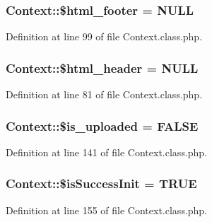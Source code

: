 \hypertarget{classContext_ad55e79b648659c59512e02a6c0d349ff}{
\subsubsection[{\$html\-\_\-footer}]{\setlength{\rightskip}{0pt plus 5cm}Context\-::\$html\-\_\-footer = N\-U\-L\-L}}\label{classContext_ad55e79b648659c59512e02a6c0d349ff}


Definition at line 99 of file Context.\-class.\-php.

\hypertarget{classContext_ab0146079ffcc658bbe5bbf4ba7b8e934}{
\subsubsection[{\$html\-\_\-header}]{\setlength{\rightskip}{0pt plus 5cm}Context\-::\$html\-\_\-header = N\-U\-L\-L}}\label{classContext_ab0146079ffcc658bbe5bbf4ba7b8e934}


Definition at line 81 of file Context.\-class.\-php.

\hypertarget{classContext_a4f8c544baae73ab83d08ec55e0c7c00d}{
\subsubsection[{\$is\-\_\-uploaded}]{\setlength{\rightskip}{0pt plus 5cm}Context\-::\$is\-\_\-uploaded = F\-A\-L\-S\-E}}\label{classContext_a4f8c544baae73ab83d08ec55e0c7c00d}


Definition at line 141 of file Context.\-class.\-php.

\hypertarget{classContext_a342fb7b74268197dea5cadbe62aaea7a}{
\subsubsection[{\$is\-Success\-Init}]{\setlength{\rightskip}{0pt plus 5cm}Context\-::\$is\-Success\-Init = T\-R\-U\-E}}\label{classContext_a342fb7b74268197dea5cadbe62aaea7a}


Definition at line 155 of file Context.\-class.\-php.

